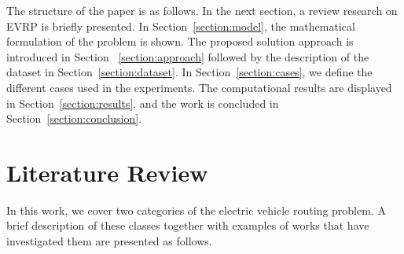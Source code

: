 \documentclass[11pt]{article}
\begin{document}
The structure of the paper is as follows. In the next section, a review research on EVRP is briefly presented. In Section~\ref{section:model}, the mathematical formulation of the problem is shown. The proposed solution approach is introduced in Section ~\ref{section:approach} followed by the description of the dataset in Section~\ref{section:dataset}. In Section~\ref{section:cases}, we define the different cases used in the experiments. The computational results are displayed in Section~\ref{section:results}, and the work is concluded in Section~\ref{section:conclusion}.

\section{Literature Review}
In this work, we cover two categories of the electric vehicle routing problem. A brief description of these classes together with examples of works that have investigated them are presented as follows. 
\end{document}
